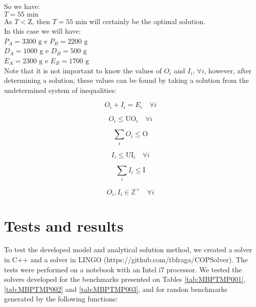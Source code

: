 \documentclass[authoryear,preprint,12pt]{elsarticle}
\begin{document}
So we have: \\

$T = 55 \textrm{ min}$ \\

As $T<\textrm{Z}$, then $T = 55 \textrm{ min}$ will certainly be the optimal solution. \\

In this case we will have: \\

$P_A = 3300 \textrm{ g}$ e $P_B=2200 \textrm{ g}$ \\

$D_A = 1000 \textrm{ g}$ e $D_B = 500 \textrm{ g}$ \\

$E_A = 2300 \textrm{ g}$ e $E_B = 1700 \textrm{ g}$ \\

Note that it is not important to know the values of $O_i$ and $I_i$, $\forall i$, however, after determining a solution, these values can be found by taking a solution from the undetermined system of inequalities:

\begin{equation}
O_i + I_i = E_i \quad \forall i
\end{equation}

\begin{equation}
O_i \leq \textrm{UO}_i \quad \forall i
\end{equation}

\begin{equation}
\sum_i{O_i} \leq \textrm{O}
\end{equation}

\begin{equation}
I_i \leq \textrm{UI}_i \quad \forall i
\end{equation}

\begin{equation}
\sum_i{I_i} \leq \textrm{I}
\end{equation}

\begin{equation}
O_i, I_i \in  \mathbb{Z}^+ \quad \forall i
\end{equation}

\section{Tests and results}
\label{sec:results}

To test the developed model and analytical solution method, we created a solver in C++ and a solver in LINGO (https://github.com/tbfraga/COPSolver). The tests were performed on a notebook with an Intel i7 processor. We tested the solvers developed for the benchmarks presented on Tables \ref{tab:MBPTMP001}, \ref{tab:MBPTMP002} and \ref{tab:MBPTMP003}, and for randon benchmarks generated by the following functions: \\
\end{document}
